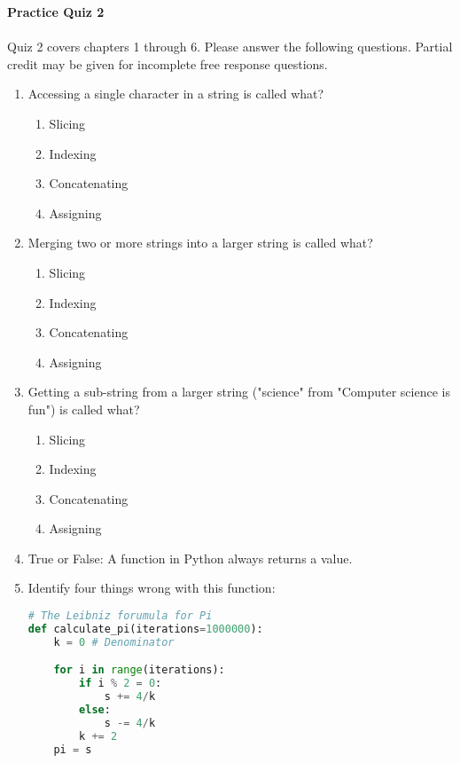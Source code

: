 \documentclass[letter,10pt]{article}
\begin{document}
\huge
\textbf{Practice Quiz 2}
\normalsize

\paragraph{}Quiz 2 covers chapters 1 through 6. Please answer the following questions. Partial credit may be given for incomplete free response questions.

\begin{enumerate}
    \item Accessing a single character in a string is called what?
    \begin{enumerate}
        \item Slicing
        \item Indexing
        \item Concatenating
        \item Assigning
    \end{enumerate}

    \item Merging two or more strings into a larger string is called what?
    \begin{enumerate}
        \item Slicing
        \item Indexing
        \item Concatenating
        \item Assigning
    \end{enumerate}

    \item Getting a sub-string from a larger string ("science" from "Computer science is fun") is called what?
    \begin{enumerate}
        \item Slicing
        \item Indexing
        \item Concatenating
        \item Assigning
    \end{enumerate}

    \item True or False: A function in Python always returns a value.

    \item Identify four things wrong with this function:
    \begin{lstlisting}[language=python]
# The Leibniz forumula for Pi
def calculate_pi(iterations=1000000):
    k = 0 # Denominator

    for i in range(iterations):
        if i % 2 = 0:
            s += 4/k
        else:
            s -= 4/k
        k += 2
    pi = s


\end{lstlisting}
\end{enumerate}
\end{document}
